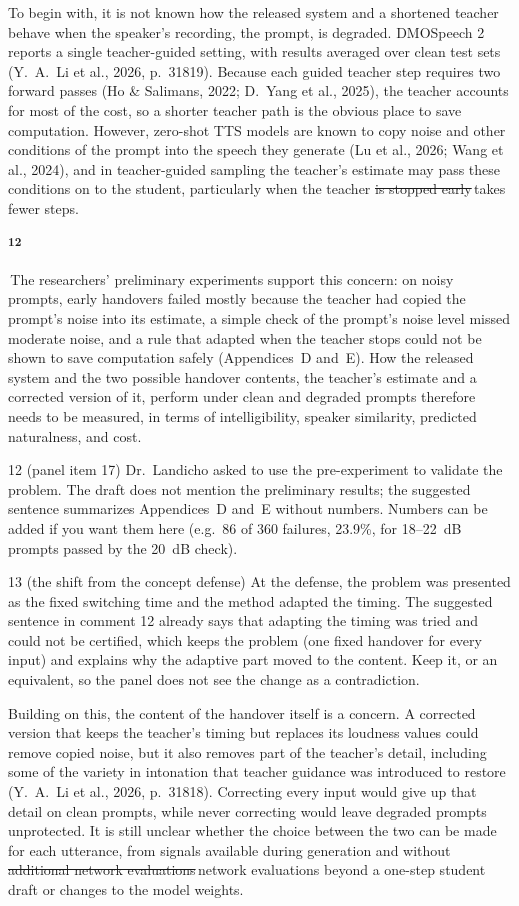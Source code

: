 \documentclass[11pt,a4paper]{article}
\newcommand{\chg}[2]{{\color{delcol}\sout{#1}}\,{\color{addcol}#2}}
\newcommand{\add}[1]{{\color{addcol}#1}}
\newcommand{\flag}[2]{\colorbox{flagcol}{\strut\textsuperscript{\bfseries #1}}\,{#2}}
\newcounter{cmt}
\begin{document}
To begin with, it is not known how the released system and a shortened teacher behave when the speaker's recording, the prompt, is degraded. DMOSpeech 2 reports a single teacher-guided setting, with results averaged over clean test sets (Y.\ A.\ Li et al., 2026, p.~31819). Because each guided teacher step requires two forward passes (Ho \& Salimans, 2022; D.\ Yang et al., 2025), the teacher accounts for most of the cost, so a shorter teacher path is the obvious place to save computation. However, zero-shot TTS models are known to copy noise and other conditions of the prompt into the speech they generate (Lu et al., 2026; Wang et al., 2024), and in teacher-guided sampling the teacher's estimate may pass these conditions on to the student, particularly when the teacher \chg{is stopped early}{takes fewer steps}. \flag{12}{\add{The researchers' preliminary experiments support this concern: on noisy prompts, early handovers failed mostly because the teacher had copied the prompt's noise into its estimate, a simple check of the prompt's noise level missed moderate noise, and a rule that adapted when the teacher stops could not be shown to save computation safely (Appendices~D and~E).}} How the released system and the two possible handover contents, the teacher's estimate and a corrected version of it, perform under clean and degraded prompts therefore needs to be measured, in terms of intelligibility, speaker similarity, predicted naturalness, and cost.

\begin{cmt}{12 (panel item 17)}
Dr.~Landicho asked to use the pre-experiment to validate the problem. The draft does not mention the preliminary results; the suggested sentence summarizes Appendices~D and~E without numbers. Numbers can be added if you want them here (e.g.\ 86 of 360 failures, 23.9\%, for 18--22~dB prompts passed by the 20~dB check).
\end{cmt}
\begin{cmt}{13 (the shift from the concept defense)}
At the defense, the problem was presented as the fixed switching time and the method adapted the timing. The suggested sentence in comment 12 already says that adapting the timing was tried and could not be certified, which keeps the problem (one fixed handover for every input) and explains why the adaptive part moved to the content. Keep it, or an equivalent, so the panel does not see the change as a contradiction.
\end{cmt}

Building on this, the content of the handover itself is a concern. A corrected version that keeps the teacher's timing but replaces its loudness values could remove copied noise, but it also removes part of the teacher's detail, including some of the variety in intonation that teacher guidance was introduced to restore (Y.\ A.\ Li et al., 2026, p.~31818). Correcting every input would give up that detail on clean prompts, while never correcting would leave degraded prompts unprotected. It is still unclear whether the choice between the two can be made for each utterance, from signals available during generation and without \chg{additional network evaluations}{network evaluations beyond a one-step student draft} or changes to the model weights.
\end{document}
